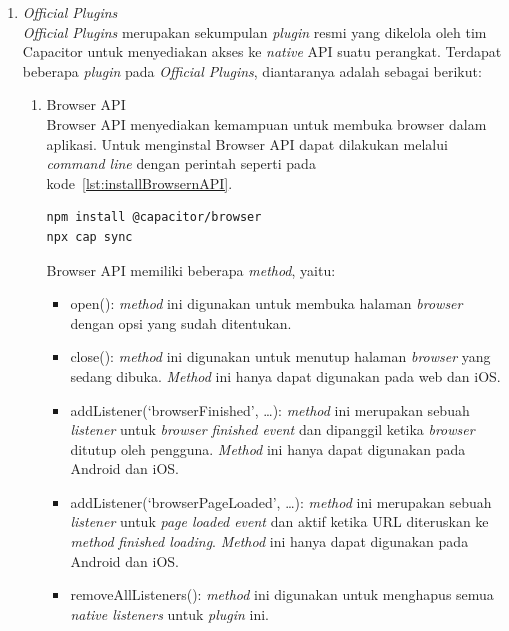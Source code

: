 \begin{enumerate}
	\item \textit{Official Plugins} \\
		\textit{Official Plugins} merupakan sekumpulan \textit{plugin} resmi yang dikelola oleh tim Capacitor untuk menyediakan akses ke \textit{native} API suatu perangkat. Terdapat beberapa \textit{plugin} pada \textit{Official Plugins}, diantaranya adalah sebagai berikut:

		\begin{enumerate}
		
			\item Browser API \\
				Browser API menyediakan kemampuan untuk membuka browser dalam aplikasi. Untuk menginstal Browser API dapat dilakukan melalui \textit{command line} dengan perintah seperti pada kode~\ref{lst:installBrowsernAPI}. 
\begin{lstlisting}[label={lst:installBrowsernAPI}, caption=Kode untuk Instalasi Browser API]
npm install @capacitor/browser
npx cap sync
\end{lstlisting}

				Browser API memiliki beberapa \textit{method}, yaitu:
				\begin{itemize}
					\item open(): \textit{method} ini digunakan untuk membuka halaman \textit{browser} dengan opsi yang sudah ditentukan.
					\item close(): \textit{method} ini digunakan untuk menutup halaman \textit{browser} yang sedang dibuka. \textit{Method} ini hanya dapat digunakan pada web dan iOS.
					
					\item addListener(‘browserFinished’, …): \textit{method} ini merupakan sebuah \textit{listener} untuk \textit{browser finished event} dan dipanggil ketika \textit{browser} ditutup oleh pengguna. \textit{Method} ini hanya dapat digunakan pada Android dan iOS.
					\item addListener(‘browserPageLoaded’, …): \textit{method} ini merupakan sebuah \textit{listener} untuk \textit{page loaded event} dan aktif ketika URL diteruskan ke \textit{method} \textit{finished loading}. \textit{Method} ini hanya dapat digunakan pada Android dan iOS.
					\item removeAllListeners(): \textit{method} ini digunakan untuk menghapus semua \textit{native listeners} untuk \textit{plugin} ini.
				\end{itemize}


\end{enumerate}
\end{enumerate}

